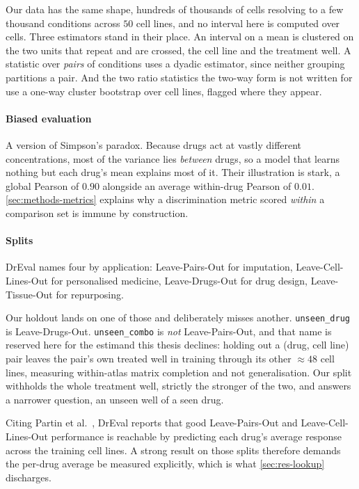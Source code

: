 Our data has the same shape, hundreds of thousands of cells resolving to a few
thousand conditions across $50$ cell lines, and no interval here is computed over
cells. Three estimators stand in their place. An interval on a mean is clustered
on the two units that repeat and are crossed, the cell line and the treatment
well. A statistic over \emph{pairs} of conditions uses a dyadic estimator, since
neither grouping partitions a pair. And the two ratio statistics the two-way form
is not written for use a one-way cluster bootstrap over cell lines, flagged where
they appear.

\paragraph{Biased evaluation} A version of Simpson's paradox. Because drugs act
at vastly different concentrations, most of the variance lies \emph{between}
drugs, so a model that learns nothing but each drug's mean explains most of it.
Their illustration is stark, a global Pearson of $0.90$ alongside an average
within-drug Pearson of $0.01$. \cref{sec:methods-metrics} explains why a
discrimination metric scored \emph{within} a comparison set is immune by
construction.

\paragraph{Splits} DrEval names four by application: Leave-Pairs-Out for
imputation, Leave-Cell-Lines-Out for personalised medicine, Leave-Drugs-Out for
drug design, Leave-Tissue-Out for
repurposing.

Our holdout lands on one of those and deliberately misses another.
\texttt{unseen\_drug} is Leave-Drugs-Out. \texttt{unseen\_combo} is \emph{not}
Leave-Pairs-Out, and that name is reserved here for the estimand this thesis
declines: holding out a (drug, cell line) pair leaves the pair's own treated well
in training through its other $\approx 48$ cell lines, measuring within-atlas
matrix completion and not generalisation. Our split withholds the whole treatment
well, strictly the stronger of the two, and answers a narrower question, an
unseen well of a seen drug.

Citing Partin et al.~\cite{partin}, DrEval reports that good Leave-Pairs-Out and
Leave-Cell-Lines-Out performance is reachable by predicting each drug's
average response across the training cell lines. A strong result on those splits
therefore demands the per-drug average be measured explicitly, which is what
\cref{sec:res-lookup} discharges.

